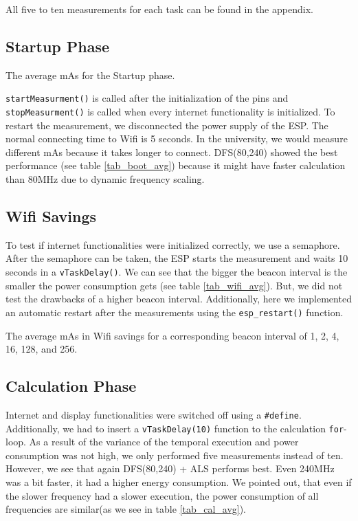 All five to ten measurements for each task can be found in the appendix.

\subsection{Startup Phase}
\begin{table}[h]
    \centering
    \resizebox{\columnwidth}{!}{%
        
    }
    \caption{The average mAs for the Startup phase.}
    \label{tab_boot_avg}
\end{table}

\verb!startMeasurment()! is called after the initialization of the pins and
\verb!stopMeasurment()! is called when every internet functionality is initialized.
To restart the measurement, we disconnected the power supply of the ESP.
The normal connecting time to Wifi is 5 seconds. In the university, we would measure
different mAs because it takes longer to connect. DFS(80,240) showed the best performance
(see table \ref{tab_boot_avg}) because
it might have faster calculation than 80MHz due to dynamic frequency scaling.

\subsection{Wifi Savings}
To test if internet functionalities were initialized correctly, we use a semaphore.
After the semaphore can be taken, the ESP starts the measurement
and waits 10 seconds in a \verb!vTaskDelay()!. We can see that the bigger the beacon
interval is the smaller the power consumption gets (see table \ref{tab_wifi_avg}).
But, we did not test the drawbacks of a higher beacon interval.
Additionally, here we implemented an automatic restart after
the measurements using the \verb!esp_restart()! function. 

\begin{table}[h]
    \centering
    \resizebox{\columnwidth}{!}{%
        
    }
    \caption{The average mAs in Wifi savings for a corresponding beacon interval of 1, 2, 4, 16, 128, and 256.}
    \label{tab_wifi_avg}
\end{table}


\subsection{Calculation Phase}

Internet and display functionalities were switched off using a \verb!#define!. Additionally,
we had to insert a \verb!vTaskDelay(10)! function to the calculation \verb!for!-loop.
As a result of the variance of the temporal execution and power consumption was not high, we
only performed five measurements instead of ten. However, we see that again DFS(80,240) + ALS
performs best. Even 240MHz was a bit faster, it had a higher energy consumption.
We pointed out, that even if the slower frequency had a slower execution, the power consumption
of all frequencies are similar(as we see in table \ref{tab_cal_avg}).

